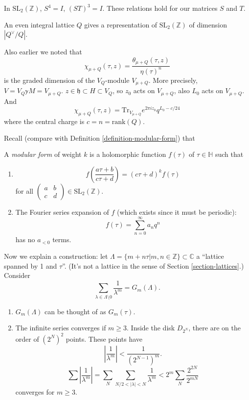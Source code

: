 In $\text{SL}_2(\mathbb{Z})$, $S^4=I$, $(ST)^3=I$.
These relations hold for our matrices $S$ and $T$.

\begin{proposition}
\label{proposition-lattices-and-sl2-representations}
An even integral lattice $Q$ 
gives a representation of $\text{SL}_2(\mathbb{Z})$ 
of dimension $|Q^\vee/Q|$.
\end{proposition}

\noindent
Also earlier we noted that
$$
\chi_{\mu+Q}(\tau,z)
=\frac{\theta_{\mu+Q}(\tau,z)}{\eta(\tau)^n}
$$
is the graded dimension of the $V_Q$-module  $V_{\mu+Q}$.
More precisely,
$V=V_Q\mathbb{y}M=V_{\mu+Q}$.
$z \in \mathfrak{h}\subset H\subset V_Q$,
so $z_0$ acts on $V_{\mu+Q}$,
also $L_0$ acts on $V_{\mu+Q}.$ 
And
$$
\chi_{\mu+Q}(\tau,z)=\text{Tr}_{V_{\mu+Q}}e^{2\pi i z_0}
q^{L_0-c/24}
$$
where the central charge is $c=n=\text{rank}(Q)$.

\medskip\noindent
Recall (compare with Definition \ref{definition-modular-form}) that

\begin{definition}
\label{definition-modular-form2}
A {\it modular form} of weight $k$ is a holomorphic function
$f(\tau)$ of $\tau \in \mathbb{H}$ such that
\begin{enumerate}
\item 
$$
f\left(\frac{a\tau+b}{c\tau+d}\right)
=(c\tau+d)^kf(\tau)
$$
for all 
$\begin{pmatrix}
a&b\\ 
c&d
\end{pmatrix}\in \text{SL}_2(\mathbb{Z})$.

\item The Fourier series expansion of $f$ 
(which exists since it must be periodic):
 $$
f(\tau)=\sum_{n=0}^\infty a_nq^n
$$
has no $a_{<0}$ terms.
\end{enumerate}
\end{definition}

\medskip\noindent
Now we explain a construction:
let $\Lambda=\{m+n\tau|m,n \in \mathbb{Z}\}\subset\mathbb{C}$
a ``lattice spanned by 1 and $\tau$''.
(It's not a lattice in the sense of Section \ref{section-lattices}.)
Consider
$$
\sum_{\lambda \in \Lambda\setminus 0}
\frac{1}{\lambda^m}=G_m(\Lambda).
$$
\begin{enumerate}
\item $G_m(\Lambda)$ can be thought of as $G_m(\tau)$.
\item The infinite series converges if $m \geq 3$.
Inside the disk $D_{2^N}$, there are
on the order of $(2^N)^2$ points.
These points have
$$
\left|\frac{1}{\lambda^m}\right|<\frac{1}{(2^{N-1})^m}.
$$
$$
\sum\left|\frac{1}{\lambda^m}\right|
=\sum_N\sum_{N/2<|\lambda|<N}
\frac{1}{\lambda^m}
<2^m \sum_N\frac{2^{2N}}{2^{m N}}
$$
converges for $m \geq 3$.
\end{enumerate}

